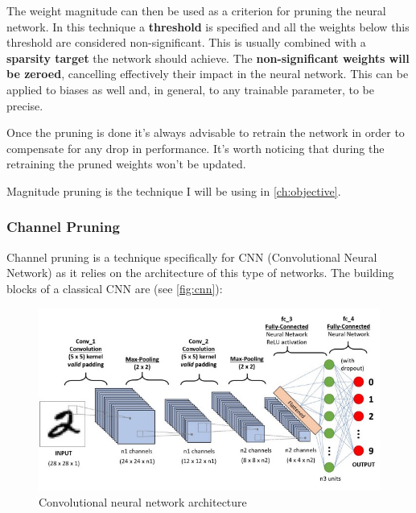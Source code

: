 The weight magnitude can then be used as a criterion for pruning the neural
network.
In this technique a \textbf{threshold} is specified and all the weights below
this threshold are considered non-significant. This is usually combined with a
\textbf{sparsity target} the network should achieve.
The \textbf{non-significant weights will be zeroed}, cancelling effectively
their impact in the neural network.
This can be applied to biases as well and, in general, to any trainable
parameter, to be precise.

Once the pruning is done it's always advisable to retrain the network in order
to compensate for any drop in performance. It's worth noticing that during the
retraining the pruned weights won't be updated.~\cite{magnitude_pruning}

Magnitude pruning is the technique I will be using in
\autoref{ch:objective}.

\subsubsection{Channel Pruning}
Channel pruning is a technique specifically for CNN (Convolutional Neural
Network) as it relies on the architecture of this type of networks.
The building blocks of a classical CNN are (see \autoref{fig:cnn}):

\begin{figure}[ht]
    \includegraphics[width=\textwidth]{images/pruning/cnn.jpeg}
    \centering
    \caption{Convolutional neural network architecture}\label{fig:cnn}
\end{figure}

